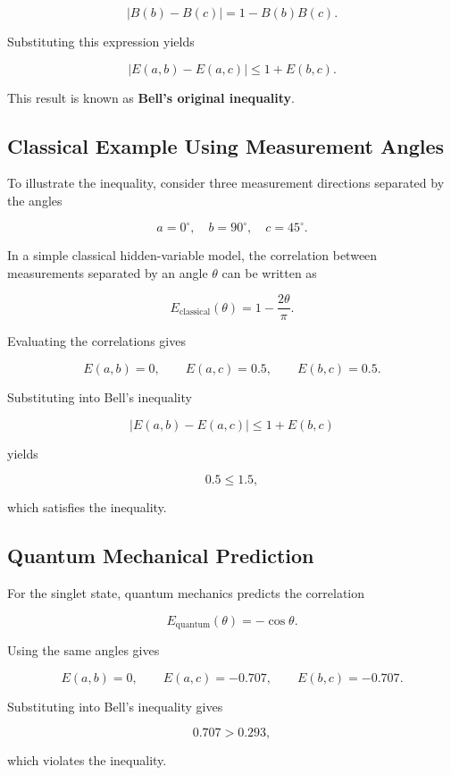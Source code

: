 \documentclass[17pt,a4paper]{extarticle}
\begin{document}
\[
|B(b) - B(c)| = 1 - B(b)B(c).
\]

Substituting this expression yields

\[
|E(a,b) - E(a,c)| \le 1 + E(b,c).
\]

This result is known as \textbf{Bell’s original inequality}.


\subsection{Classical Example Using Measurement Angles}

To illustrate the inequality, consider three measurement directions separated by the angles

\[
a = 0^\circ, \quad b = 90^\circ, \quad c = 45^\circ.
\]

In a simple classical hidden-variable model, the correlation between measurements separated by an angle $\theta$ can be written as

\[
E_{\text{classical}}(\theta) = 1 - \frac{2\theta}{\pi}.
\]

Evaluating the correlations gives

\[
E(a,b) = 0, \qquad E(a,c) = 0.5, \qquad E(b,c) = 0.5.
\]

Substituting into Bell’s inequality

\[
|E(a,b) - E(a,c)| \le 1 + E(b,c)
\]

yields

\[
0.5 \le 1.5,
\]

which satisfies the inequality.


\subsection{Quantum Mechanical Prediction}

For the singlet state, quantum mechanics predicts the correlation

\[
E_{\text{quantum}}(\theta) = -\cos \theta.
\]

Using the same angles gives

\[
E(a,b) = 0, \qquad
E(a,c) = -0.707, \qquad
E(b,c) = -0.707.
\]

Substituting into Bell’s inequality gives

\[
0.707 > 0.293,
\]

which violates the inequality.
\end{document}
